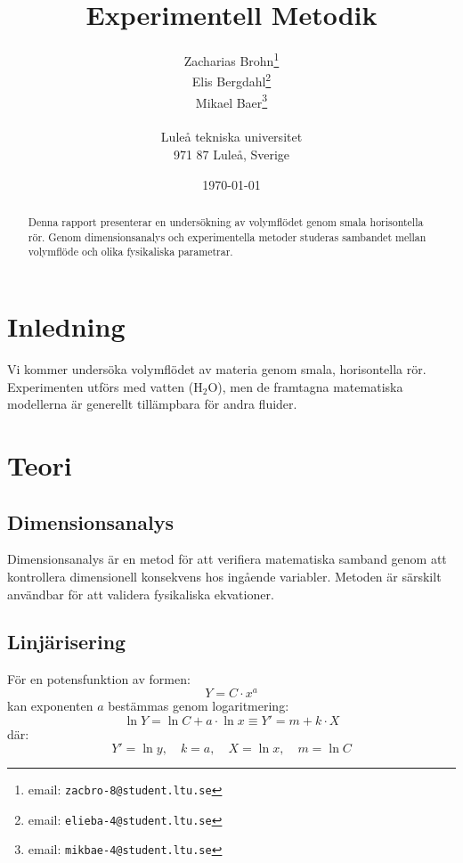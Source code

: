 \documentclass[a4paper,12pt]{article}
\begin{document}
%
\title{Experimentell Metodik}
%
\author{Zacharias Brohn\thanks{email: \texttt{zacbro-8@student.ltu.se}}\\  
        Elis Bergdahl\thanks{email: \texttt{elieba-4@student.ltu.se}} \\
        Mikael Baer\thanks{email: \texttt{mikbae-4@student.ltu.se}} \\
        \\
        Luleå tekniska universitet \\ 
        971 87 Luleå, Sverige}
%
\date{\today}
%
\maketitle
%
\begin{abstract}
    Denna rapport presenterar en undersökning av volymflödet genom smala horisontella rör. 
    Genom dimensionsanalys och experimentella metoder studeras sambandet mellan volymflöde 
    och olika fysikaliska parametrar.
\end{abstract}
%
\section{Inledning}
Vi kommer undersöka volymflödet av materia genom smala, horisontella rör. 
Experimenten utförs med vatten ($\mathrm{H_2O}$), men de framtagna matematiska 
modellerna är generellt tillämpbara för andra fluider.
%
\section{Teori}
%
\subsection{Dimensionsanalys}
Dimensionsanalys är en metod för att verifiera matematiska samband genom att 
kontrollera dimensionell konsekvens hos ingående variabler. Metoden är särskilt 
användbar för att validera fysikaliska ekvationer.
%
\subsection{Linjärisering}
För en potensfunktion av formen:
\begin{equation}
    Y = C \cdot x^a
\end{equation}
kan exponenten $a$ bestämmas genom logaritmering:
\begin{equation}
    \ln Y = \ln C + a \cdot \ln x \equiv Y' = m + k \cdot X
\end{equation}
där:
\begin{equation}
    Y' = \ln y,\quad k = a,\quad X = \ln x,\quad m = \ln C
\end{equation}
%
\end{document}

